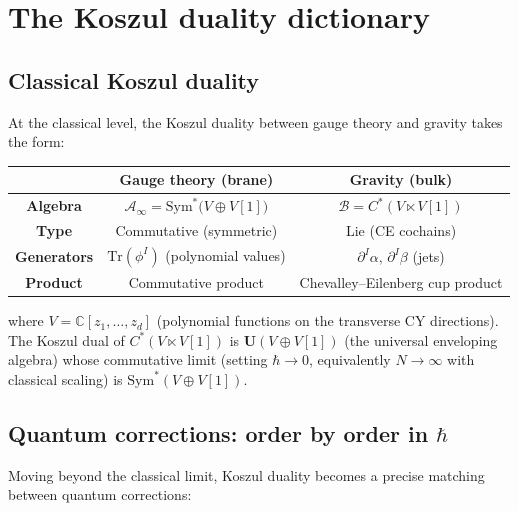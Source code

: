 \documentclass[11pt]{article}
\theoremstyle{definition}
\theoremstyle{remark}
\newcommand{\Sym}{\mathrm{Sym}}
\newcommand{\Tr}{\mathrm{Tr}}
\newcommand{\cA}{\mathcal{A}}
\newcommand{\cB}{\mathcal{B}}
\begin{document}
\section{The Koszul duality dictionary}
\label{sec:koszul-dictionary}

\subsection{Classical Koszul duality}

At the classical level, the Koszul duality between gauge theory and gravity
takes the form:

\begin{center}
\renewcommand{\arraystretch}{1.4}
\begin{tabular}{|c|c|c|}
\hline
& \textbf{Gauge theory (brane)} & \textbf{Gravity (bulk)} \\
\hline
\textbf{Algebra} & $\cA_\infty = \Sym^*\bigl(V \oplus V[1]\bigr)$ &
 $\cB = C^*(V \ltimes V[1])$ \\
\hline
\textbf{Type} & Commutative (symmetric) & Lie (CE cochains) \\
\hline
\textbf{Generators} & $\Tr(\phi^I)$ (polynomial values) &
 $\partial^I \alpha, \, \partial^I \beta$ (jets) \\
\hline
\textbf{Product} & Commutative product & Chevalley--Eilenberg cup product \\
\hline
\end{tabular}
\end{center}

\noindent
where $V = \mathbb{C}[z_1, \ldots, z_d]$ (polynomial functions on the
transverse CY directions). The Koszul dual of $C^*(V \ltimes V[1])$ is
$\mathbf{U}(V \oplus V[1])$ (the universal enveloping algebra) whose
commutative limit (setting $\hbar \to 0$, equivalently $N \to \infty$ with
classical scaling) is $\Sym^*(V \oplus V[1])$.

\subsection{Quantum corrections: order by order in $\hbar$}
\label{sec:quantum-corrections}

Moving beyond the classical limit, Koszul duality becomes a precise matching
between quantum corrections:
\end{document}
